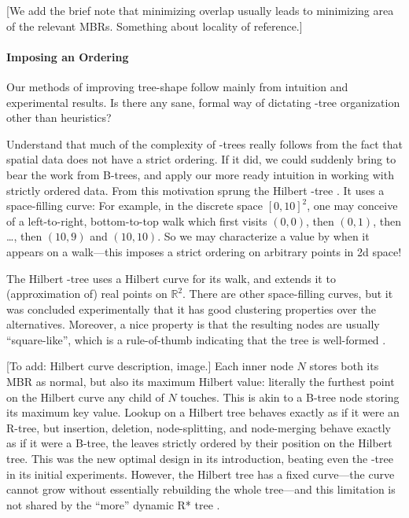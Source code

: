 [We add the brief note that minimizing overlap usually leads to minimizing area of the relevant MBRs.
Something about locality of reference.]

\paragraph{Imposing an Ordering}
Our methods of improving tree-shape follow mainly from intuition and experimental results.
Is there any sane, formal way of dictating \rbase-tree organization other than heuristics?

Understand that much of the complexity of \rbase-trees really follows from the fact that spatial data does not have a strict ordering.
If it did, we could suddenly bring to bear the work from B-trees, and apply our more ready intuition in working with strictly ordered data.
From this motivation sprung the Hilbert \rbase-tree \cite{kamelfaloutsos94}.
It uses a space-filling curve:
For example, in the discrete space $[0,10]^2$, one may conceive of a left-to-right, bottom-to-top walk which first visits $(0,0)$, then $(0,1)$, then \ldots, then $(10,9)$ and $(10,10)$.
So we may characterize a value by when it appears on a walk---this imposes a strict ordering on arbitrary points in 2d space!

The Hilbert \rbase-tree uses a Hilbert curve for its walk, and extends it to (approximation of) real points on $\mathbb R^2$.
There are other space-filling curves, but it was concluded experimentally that it has good clustering properties \cite{kamelfaloutsos94} over the alternatives.
Moreover, a nice property is that the resulting nodes are usually ``square-like'', which is a rule-of-thumb indicating that the tree is well-formed \cite{kamelfaloutsos94,theodoridissellis96}.

[To add: Hilbert curve description, image.]
Each inner node $N$ stores both its MBR as normal, but also its maximum Hilbert value: literally the furthest point on the Hilbert curve any child of $N$ touches.
This is akin to a B-tree node storing its maximum key value.
Lookup on a Hilbert tree behaves exactly as if it were an R-tree, but insertion, deletion, node-splitting, and node-merging behave exactly as if it were a B-tree, the leaves strictly ordered by their position on the Hilbert tree.
This was the new optimal design in its introduction, beating even the \rstar-tree in its initial experiments.
However, the Hilbert tree has a fixed curve---the curve cannot grow without essentially rebuilding the whole tree---and this limitation is not shared by the ``more'' dynamic R* tree \cite{beckmannseeger09}.

